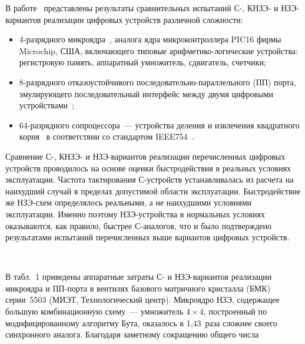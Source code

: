 \begin{multicols}{2}
       В работе~\cite{55-sok} представлены результаты сравнительных испытаний С-, 
       КНЗЭ- и НЗЭ-вариантов реализации цифровых устройств различной сложности: 
       \begin{itemize}
\item 4-разрядного микроядра~\cite{33-sok}, 
аналога ядра микроконтроллера PIC16 фирмы Microchip, США, включающего типовые 
ариф\-ме\-ти\-ко-ло\-ги\-че\-ские устройства: регистровую память, аппаратный 
умножитель, сдвигатель, счетчики;
\item 8-разрядного отказоустойчивого по\-сле\-до\-ва\-тель\-но-па\-рал\-лель\-но\-го  
(ПП) порта, эмулиру\-юще\-го последовательный интерфейс между двумя цифровыми 
устройствами~\cite{34-sok};
\item 64-разрядного сопроцессора~--- устройства деления и извлечения квадратного 
корня~\cite{37-sok, 38-sok, 50-sok, 49-sok} в соответствии со стандартом 
IEEE754~\cite{58-sok}.
\end{itemize}

       Сравнение С-, КНЗЭ- и НЗЭ-ва\-ри\-ан\-тов реализации перечисленных цифровых 
устройств проводилось на основе оценки быстродействия в реаль\-ных условиях 
эксплуатации. Частота тактирования С-устройств устанавливалась из расчета на наихудший 
случай в пределах допустимой области эксплуатации. Быстродействие же НЗЭ-схем 
определялось реальными, а не наихудшими условиями эксплуатации. Именно поэтому 
       НЗЭ-устройства в нормальных условиях оказываются, как правило, быстрее 
       С-ана\-ло\-гов, что и было подтверждено результатами испытаний перечисленных 
выше вариантов цифровых устройств.

\setcounter{figure}{1}
\begin{figure*}[b] %
             \vspace*{1pt}
 \begin{center}
 \mbox{%
 \epsfxsize=162.888mm
 }
 \end{center}
 \vspace*{-9pt}
\end{figure*}

\setcounter{table}{1}
\setcounter{figure}{1}
       
       В табл.~1 приведены аппаратные затраты С- и НЗЭ-ва\-ри\-ан\-тов 
реализации микроядра и ПП-пор\-та в вентилях базового матричного кристалла (БМК) 
серии~5503 (МИЭТ, Технологический центр). Мик\-ро\-яд\-ро НЗЭ, содержащее большую 
комбинационную схему~--- умножитель $4\times 4$, построенный
 по модифицированному 
алгоритму Бута, оказалось в 1,43~раза сложнее своего синхронного аналога. Благодаря 
заметному сокращению общего числа\linebreak


\end{multicols}

